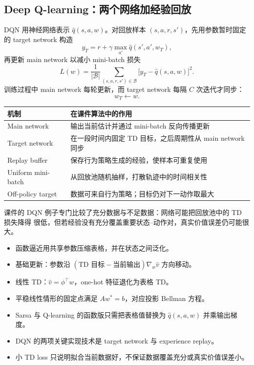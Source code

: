 \documentclass[11pt,a4paper,fontset=fandol]{ctexart}
\begin{document}
\subsection{Deep Q-learning：两个网络加经验回放}

DQN 用神经网络表示 \(\hat q(s,a,w)\)。对回放样本
\((s,a,r,s')\)，先用参数暂时固定的 target network 构造
\[
y_T=r+\gamma\max_{a'}\hat q(s',a',w_T),
\]
再更新 main network 以减小 mini-batch 损失
\[
\boxed{
L(w)=\frac{1}{|\mathcal B|}
\sum_{(s,a,r,s')\in\mathcal B}
\bigl[y_T-\hat q(s,a,w)\bigr]^2}.
\]
训练过程中 main network 每轮更新，而 target network 每隔 \(C\) 次迭代才同步：
\[
w_T\leftarrow w.
\]

\begin{center}
\begin{tabularx}{\textwidth}{
  >{\raggedright\arraybackslash}p{} X}
\toprule
机制 & 在课件算法中的作用\\
\midrule
Main network & 输出当前估计并通过 mini-batch 反向传播更新\\
Target network & 在一段时间内固定 TD 目标，之后周期性从 main network 同步\\
Replay buffer & 保存行为策略生成的经验，使样本可重复使用\\
Uniform mini-batch & 从回放池随机抽样，打散轨迹中的时间相关性\\
Off-policy target & 数据可来自行为策略；目标仍对下一动作取最大\\
\bottomrule
\end{tabularx}
\end{center}

\begin{warningbox}[训练损失小不等于价值一定准确]
课件的 DQN 例子专门比较了充分数据与不足数据：网络可能把回放池中的 TD 损失降得
很低，但若经验没有充分覆盖重要状态--动作对，真实价值误差仍可能很大。
\end{warningbox}

\begin{memorybox}[L8 本章速记]
\begin{itemize}
  \item 函数逼近用共享参数压缩表格，并在状态之间泛化。
  \item 基础更新：参数沿
  \((\text{TD 目标}-\text{当前输出})\nabla_w\hat v\) 方向移动。
  \item 线性 TD：\(\hat v=\phi^\top w\)，one-hot 特征退化为表格 TD。
  \item 平稳线性情形的固定点满足 \(Aw^*=b\)，对应投影 Bellman 方程。
  \item Sarsa 与 Q-learning 的函数版只需把表格值替换为
  \(\hat q(s,a,w)\) 并乘输出梯度。
  \item DQN 的两项关键实现技术是 target network 与 experience replay。
  \item 小 TD loss 只说明拟合当前数据好，不保证数据覆盖充分或真实价值误差小。
\end{itemize}
\end{memorybox}
\end{document}
